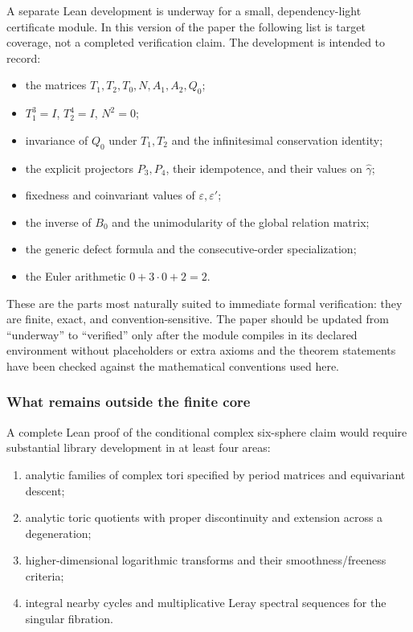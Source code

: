 \documentclass[11pt,reqno]{amsart}
\numberwithin{equation}{section}
\newcommand{\eps}{\varepsilon}
\newcommand{\epsp}{\varepsilon'}
\newcommand{\wideg}{\widehat\gamma}
\theoremstyle{definition}
\begin{document}
A separate Lean development is underway for a small, dependency-light certificate module. In this version of the paper the following list is target coverage, not a completed verification claim. The development is intended to record:
\begin{itemize}
\item the matrices $T_1,T_2,T_0,N,A_1,A_2,Q_0$;
\item $T_1^3=I$, $T_2^4=I$, $N^2=0$;
\item invariance of $Q_0$ under $T_1,T_2$ and the infinitesimal conservation identity;
\item the explicit projectors $P_3,P_4$, their idempotence, and their values on $\wideg$;
\item fixedness and coinvariant values of $\eps,\epsp$;
\item the inverse of $B_0$ and the unimodularity of the global relation matrix;
\item the generic defect formula and the consecutive-order specialization;
\item the Euler arithmetic $0+3\cdot0+2=2$.
\end{itemize}

These are the parts most naturally suited to immediate formal verification: they are finite, exact, and convention-sensitive. The paper should be updated from ``underway'' to ``verified'' only after the module compiles in its declared environment without placeholders or extra axioms and the theorem statements have been checked against the mathematical conventions used here.

\subsubsection{What remains outside the finite core}

A complete Lean proof of the conditional complex six-sphere claim would require substantial library development in at least four areas:
\begin{enumerate}
\item analytic families of complex tori specified by period matrices and equivariant descent;
\item analytic toric quotients with proper discontinuity and extension across a degeneration;
\item higher-dimensional logarithmic transforms and their smoothness/freeness criteria;
\item integral nearby cycles and multiplicative Leray spectral sequences for the singular fibration.
\end{enumerate}
\end{document}

